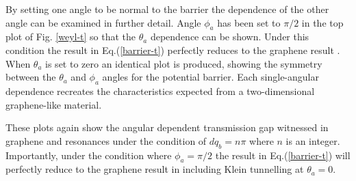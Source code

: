 \documentclass[prb,twocolumn,aps,superscriptaddress,showpacs,floatfix]{revtex4}
\begin{document}
	By setting one angle to be normal to the barrier the dependence of the other angle can be examined in further detail. Angle $\phi_{a}$ has been set to $\pi/2$ in the top plot of Fig. \ref{weyl-t} so that the $\theta_{a}$ dependence can be shown. Under this condition the result in Eq.(\ref{barrier-t}) perfectly reduces to the graphene result \cite{b1,b11,b12}. When $\theta_{a}$ is set to zero an identical plot is produced, showing the symmetry between the $\theta_{a}$ and $\phi_{a}$ angles for the potential barrier. Each single-angular dependence recreates the characteristics expected from a two-dimensional graphene-like material.

	These plots again show the angular dependent transmission gap witnessed in graphene \cite{b16} and resonances under the condition of $dq_{b}=n\pi$ \cite{b14} where $n$ is an integer. Importantly, under the condition where $\phi_{a}=\pi/2$ the result in Eq.(\ref{barrier-t}) will perfectly reduce to the graphene result in \cite{b1} including Klein tunnelling \cite{b12} at $\theta_{a}=0$.

\end{document}
